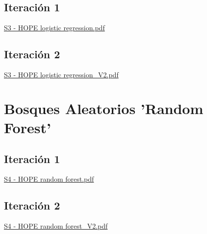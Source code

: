 \subsection{Iteración 1}
\label{anx04:rl1}
\href{file://./anexos/S3 - HOPE logistic regression.pdf}{S3 - HOPE logistic regression.pdf}

\subsection{Iteración 2}
\label{anx04:rl2}
\href{file://./anexos/S3 - HOPE logistic regression_V2.pdf}{S3 - HOPE logistic regression\_V2.pdf}

\section{Bosques Aleatorios 'Random Forest'}
\label{anx05:rf}
\subsection{Iteración 1}
\label{anx05:rf1}
\href{file://./anexos/S4 - HOPE random forest.pdf}{S4 - HOPE random forest.pdf}

\subsection{Iteración 2}
\label{anx05:rf2}
\href{file://./anexos/S4 - HOPE random forest_V2.pdf}{S4 - HOPE random forest\_V2.pdf}
